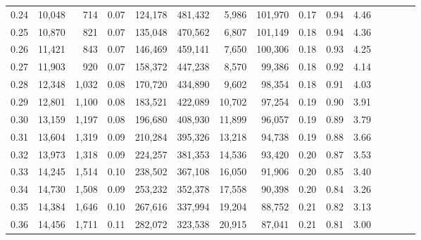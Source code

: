 \begin{tabular}{rrrcrrrrrrrrrrr}
0.24 &  10,048 &    714 &                                       0.07 &  124,178 &  481,432 &    5,986 &  101,970 &  0.17 &  0.94 &                         4.46 \\
0.25 &  10,870 &    821 &                                       0.07 &  135,048 &  470,562 &    6,807 &  101,149 &  0.18 &  0.94 &                         4.36 \\
0.26 &  11,421 &    843 &                                       0.07 &  146,469 &  459,141 &    7,650 &  100,306 &  0.18 &  0.93 &                         4.25 \\
0.27 &  11,903 &    920 &                                       0.07 &  158,372 &  447,238 &    8,570 &   99,386 &  0.18 &  0.92 &                         4.14 \\
0.28 &  12,348 &  1,032 &                                       0.08 &  170,720 &  434,890 &    9,602 &   98,354 &  0.18 &  0.91 &                         4.03 \\
0.29 &  12,801 &  1,100 &                                       0.08 &  183,521 &  422,089 &   10,702 &   97,254 &  0.19 &  0.90 &                         3.91 \\
0.30 &  13,159 &  1,197 &                                       0.08 &  196,680 &  408,930 &   11,899 &   96,057 &  0.19 &  0.89 &                         3.79 \\
0.31 &  13,604 &  1,319 &                                       0.09 &  210,284 &  395,326 &   13,218 &   94,738 &  0.19 &  0.88 &                         3.66 \\
0.32 &  13,973 &  1,318 &                                       0.09 &  224,257 &  381,353 &   14,536 &   93,420 &  0.20 &  0.87 &                         3.53 \\
0.33 &  14,245 &  1,514 &                                       0.10 &  238,502 &  367,108 &   16,050 &   91,906 &  0.20 &  0.85 &                         3.40 \\
0.34 &  14,730 &  1,508 &                                       0.09 &  253,232 &  352,378 &   17,558 &   90,398 &  0.20 &  0.84 &                         3.26 \\
0.35 &  14,384 &  1,646 &                                       0.10 &  267,616 &  337,994 &   19,204 &   88,752 &  0.21 &  0.82 &                         3.13 \\
0.36 &  14,456 &  1,711 &                                       0.11 &  282,072 &  323,538 &   20,915 &   87,041 &  0.21 &  0.81 &                         3.00 \\

\end{tabular}

